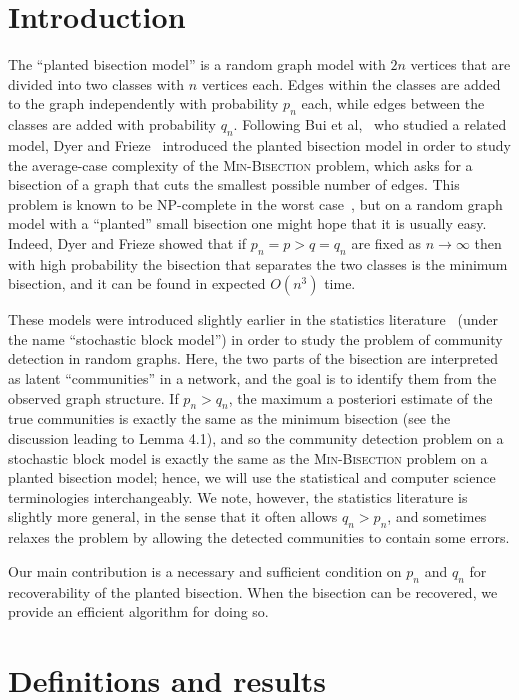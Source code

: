 \documentclass[EJP]{ejpecp}
\newcommand{\1}[1]{\mathbbm{1}_{\{#1\}}}
\begin{document}
\section{Introduction}

The ``planted bisection model'' is a random graph model with $2n$ vertices that
are divided into two classes with $n$ vertices each. Edges within the classes
are added to the graph independently with probability $p_n$ each, while edges
between the classes are added with probability $q_n$.
Following Bui et al,~\cite{BCLS:87} who studied a related model,
Dyer and Frieze~\cite{DF:89} introduced the planted bisection model
in order to study the average-case complexity of the
\textsc{Min-Bisection} problem, which asks for a bisection of a graph that cuts
the smallest possible number of edges. This problem is known to be
NP-complete in the worst case~\cite{Karp:72}, but on a random graph model with a
``planted'' small bisection one might hope that it is usually easy.
Indeed, Dyer and Frieze showed that if $p_n = p > q = q_n$ are fixed
as $n \to \infty$ then with high probability the bisection that separates the
two classes is the minimum bisection, and it can be found in expected $O(n^3)$
time.

These models were introduced slightly earlier in the statistics literature~\cite{HLL:83}
(under the name ``stochastic block model'')
in order to study the problem of community detection in random graphs.
Here, the two parts of the bisection are interpreted as latent ``communities'' in a
network, and the goal is to identify them from the observed graph structure.
If $p_n > q_n$,
the maximum a posteriori estimate of the true communities is exactly the same
as the minimum bisection (see the discussion leading to Lemma 4.1),
and so the community detection problem on a stochastic
block model is exactly the same as the \textsc{Min-Bisection}
problem on a planted bisection model; hence, we will use the statistical and computer science
terminologies interchangeably. We note, however, the statistics literature is slightly more
general, in the sense that it often
allows $q_n > p_n$, and sometimes relaxes the problem by allowing the detected communities
to contain some errors.

Our main contribution is a necessary and sufficient condition on
$p_n$ and $q_n$ for recoverability of the planted bisection.
When the bisection can be recovered, we provide an efficient algorithm
for doing so.

\section{Definitions and results}
\end{document}
